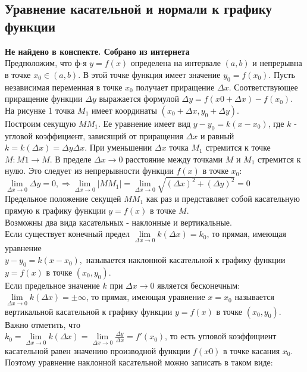 \documentclass[oneside]{book}
\begin{document}
\begin{enumerate}
\chapter{Уравнение касательной и нормали к графику функции\\}
\textbf{Не найдено в конспекте. Собрано из интернета}\\
Предположим, что ф-я $y=f(x)$ определена на интервале $(a,b)$ и непрерывна в точке $x_0 \in (a,b)$. В этой точке функция имеет значение $y_0=f(x_0)$.
Пусть независимая переменная в точке $x_0$ получает приращение $\Delta x$. Соответствующее приращение функции $\Delta y$ выражается формулой $\Delta y = f(x0+ \Delta x) - f(x_0)$.
На рисунке 1 точка $M_1$ имеет координаты $(x_0+\Delta x,y_0+\Delta y)$.\\
 Построим секущую $MM_1$. Ее уравнение имеет вид $y - y_0=k(x-x_0)$, где $k$ - угловой коэффициент, зависящий от приращения $\Delta x$
   и равный $k=k(\Delta x)=\Delta y\Delta x$. При уменьшении $\Delta x$ точка $M_1$ стремится к точке $M: M1\rightarrow M$. В пределе $\Delta x\rightarrow 0$ расстояние между точками $M$ и $M_1$ стремится к нулю. Это следует из непрерывности функции $f(x)$ в точке $x_0$:\\
   $\lim \limits_{\Delta x \rightarrow 0}\Delta y = 0, \Rightarrow \lim \limits_{\Delta x \rightarrow 0}|MM_1|=\lim \limits_{\Delta x \rightarrow 0}\sqrt{(\Delta x)^2 + (\Delta y)^2}=0$\\
   Предельное положение секущей $MM_1$ как раз и представляет собой касательную прямую к графику функции $y=f(x)$ в точке $M$.\\
   Возможны два вида касательных - наклонные и вертикальные. \\
   Если существует конечный предел $\lim \limits_{\Delta x \rightarrow 0}k(\Delta x)=k_0$, то прямая, имеющая уравнение\\
   $y-y_0=k(x-x_0),$ называется наклонной касательной к графику функции $y=f(x)$ в точке $(x_0,y_0)$.\\
   Если предельное значение $k$ при $\Delta x\rightarrow 0$ является бесконечным: $\lim \limits_{\Delta x \rightarrow 0}k(\Delta x)=\pm \infty$, то прямая, имеющая уравнение $x=x_0$ называется вертикальной касательной к графику функции $y=f(x)$ в точке $(x_0,y_0)$.\\
   Важно отметить, что 
   \\$k_0=\lim \limits_{\Delta x \rightarrow 0}k(\Delta x)=\lim \limits_{\Delta x \rightarrow 0}\frac{\Delta y}{\Delta x}=f'(x_0)$, то есть угловой коэффициент касательной равен значению производной функции $f(x0)$ в точке касания $x_0$. Поэтому уравнение наклонной касательной можно записать в таком виде: \\

\end{enumerate}
\end{document}
